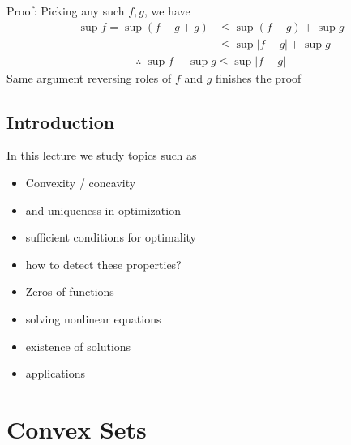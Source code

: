 \documentclass[letterpaper,10pt,english]{jupyterBook}
\begin{document}
\sphinxAtStartPar
Proof: Picking any such \(f, g\), we have
\begin{equation*}
\begin{split}
%
\sup f = \sup (f - g + g) 
& \leq \sup (f - g) + \sup g
\\
& \leq \sup | f - g | + \sup g
%
\end{split}
\end{equation*}\begin{equation*}
\begin{split}
%
\therefore \; \sup f - \sup g \leq \sup | f - g |
%
\end{split}
\end{equation*}
\sphinxAtStartPar
Same argument reversing roles of \(f\) and \(g\) finishes the proof


\subsection{Introduction}
\label{\detokenize{06.optimization_fundamentals:introduction}}
\sphinxAtStartPar
In this lecture we study topics such as
\begin{itemize}
\item {} 
\sphinxAtStartPar
Convexity / concavity

\item {} 
\sphinxAtStartPar
and uniqueness in optimization

\item {} 
\sphinxAtStartPar
sufficient conditions for optimality

\item {} 
\sphinxAtStartPar
how to detect these properties?

\item {} 
\sphinxAtStartPar
Zeros of functions

\item {} 
\sphinxAtStartPar
solving nonlinear equations

\item {} 
\sphinxAtStartPar
existence of solutions

\item {} 
\sphinxAtStartPar
applications

\end{itemize}


\section{Convex Sets}
\label{\detokenize{06.optimization_fundamentals:convex-sets}}
\end{document}
